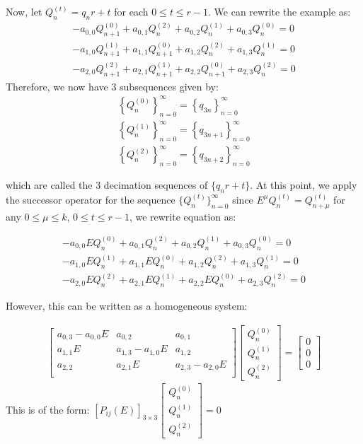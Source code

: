 \documentclass[a4paper]{article}
\theoremstyle{definition}
\begin{document}
Now, let $Q_n^{(t)}=q_{n}r+t$ for each $0 \le t \le r-1$. We can rewrite the example as:
\begin{align*}
-a_{0,0}Q_{n+1}^{(0)}+a_{0,1}Q_{n}^{(2)}
+a_{0,2}Q_{n}^{(1)}+a_{0,3}Q_{n}^{(0)} = 0 \\
-a_{1,0}Q_{n+1}^{(1)}+a_{1,1}Q_{n+1}^{(0)}
+a_{1,2}Q_{n}^{(2)}+a_{1,3}Q_{n}^{(1)} = 0 \\
-a_{2,0}Q_{n+1}^{(2)}+a_{2,1}Q_{n+1}^{(1)}
+a_{2,2}Q_{n+1}^{(0)}+a_{2,3}Q_{n}^{(2)} = 0
\end{align*}
Therefore, we now have 3 subsequences given by:
\begin{align*}
\left\{Q_n^{(0)}\right\}_{n=0}^{\infty}
=\left\{q_{3n}\right\}_{n=0}^{\infty}   \\
\left\{Q_n^{(1)}\right\}_{n=0}^{\infty}
=\left\{q_{3n+1}\right\}_{n=0}^{\infty} \\
\left\{Q_n^{(2)}\right\}_{n=0}^{\infty}
=\left\{q_{3n+2}\right\}_{n=0}^{\infty}
\end{align*}

which are called the $3$ decimation sequences of $\{q_{n}r+t\}$. At this point, we apply the successor
operator for the sequence $\{Q_n^{(t)}\}_{n=0}^{\infty}$ since $E^{\mu}Q_{n}^{(t)}=Q_{n+\mu}^{(t)}$ for
any $0 \le \mu \le k$, $0 \le t \le r-1$, we rewrite equation as:

\begin{align*}
-a_{0,0}EQ_{n}^{(0)}+a_{0,1}Q_{n}^{(2)}
+a_{0,2}Q_{n}^{(1)}+a_{0,3}Q_{n}^{(0)} = 0 \\
-a_{1,0}EQ_{n}^{(1)}+a_{1,1}EQ_{n}^{(0)}
+a_{1,2}Q_{n}^{(2)}+a_{1,3}Q_{n}^{(1)} = 0 \\
-a_{2,0}EQ_{n}^{(2)}+a_{2,1}EQ_{n}^{(1)}
+a_{2,2}EQ_{n}^{(0)}+a_{2,3}Q_{n}^{(2)} = 0
\end{align*}

However, this can be written as a homogeneous system:

\begin{align*}
\begin{bmatrix}
    a_{0,3}-a_{0,0}E & a_{0,2}          & a_{0,1}          \\
    a_{1,1}E         & a_{1,3}-a_{1,0}E & a_{1,2}          \\
    a_{2,2}          & a_{2,1}E         & a_{2,3}-a_{2,0}E \\
\end{bmatrix}
\begin{bmatrix}
    Q_{n}^{(0)} \\
    Q_{n}^{(1)} \\
    Q_{n}^{(2)}
\end{bmatrix}
=
\begin{bmatrix}
    0 \\
    0 \\
    0
\end{bmatrix}
\end{align*}
This is of the form:
$
[P_{ij}(E)]_{3 \times 3}
\begin{bmatrix}
    Q_{n}^{(0)} \\
    Q_{n}^{(1)} \\
    Q_{n}^{(2)}
\end{bmatrix}
=0
$
\end{document}
